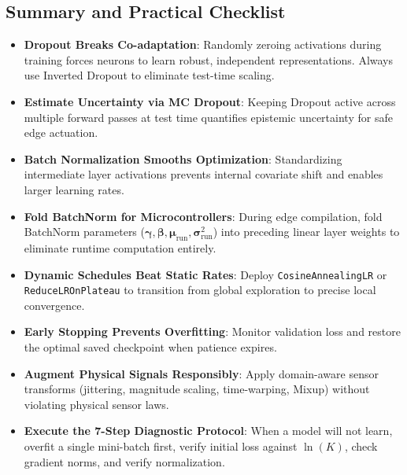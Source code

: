 \subsection{Summary and Practical Checklist}\label{subsec:training_summary}

\begin{takeaways}
\begin{itemize}
    \item \textbf{Dropout Breaks Co-adaptation}: Randomly zeroing activations during training forces neurons to learn robust, independent representations. Always use Inverted Dropout to eliminate test-time scaling.
    \item \textbf{Estimate Uncertainty via MC Dropout}: Keeping Dropout active across multiple forward passes at test time quantifies epistemic uncertainty for safe edge actuation.
    \item \textbf{Batch Normalization Smooths Optimization}: Standardizing intermediate layer activations prevents internal covariate shift and enables larger learning rates.
    \item \textbf{Fold BatchNorm for Microcontrollers}: During edge compilation, fold BatchNorm parameters ($\boldsymbol{\gamma}, \boldsymbol{\beta}, \boldsymbol{\mu}_{\text{run}}, \boldsymbol{\sigma}^2_{\text{run}}$) into preceding linear layer weights to eliminate runtime computation entirely.
    \item \textbf{Dynamic Schedules Beat Static Rates}: Deploy \texttt{CosineAnnealingLR} or \texttt{ReduceLROnPlateau} to transition from global exploration to precise local convergence.
    \item \textbf{Early Stopping Prevents Overfitting}: Monitor validation loss and restore the optimal saved checkpoint when patience expires.
    \item \textbf{Augment Physical Signals Responsibly}: Apply domain-aware sensor transforms (jittering, magnitude scaling, time-warping, Mixup) without violating physical sensor laws.
    \item \textbf{Execute the 7-Step Diagnostic Protocol}: When a model will not learn, overfit a single mini-batch first, verify initial loss against $\ln(K)$, check gradient norms, and verify normalization.
\end{itemize}
\end{takeaways}


